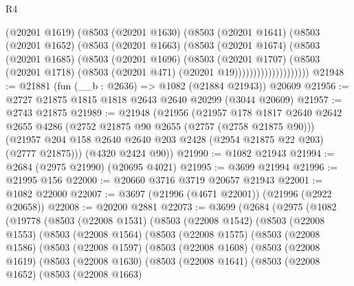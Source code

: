 \begin{lexlean}{R4}
\begin{coremodule}
                      (@20201 @1619)
                      (@8503
                        (@20201 @1630)
                        (@8503
                          (@20201 @1641)
                          (@8503
                            (@20201 @1652)
                            (@8503
                              (@20201 @1663)
                              (@8503
                                (@20201 @1674)
                                (@8503
                                  (@20201 @1685)
                                  (@8503
                                    (@20201 @1696)
                                    (@8503
                                      (@20201 @1707)
                                      (@8503
                                        (@20201 @1718)
                                        (@8503 (@20201 @471) (@20201 @19))))))))))))))))))))
@21948 := @21881 (fun (__b : @2636) => @1082 (@21884 @21943)) @20609
@21956 := @2727 @21875 @1815 @1818 @2643 @2640 @20299 (@3044 @20609)
@21957 := @2743 @21875
@21989 := @21948
    (@21956
      (@21957
        @178
        @1817
        @2640
        @2642
        @2655
        @4286
        (@2752 @21875 @90 @2655 (@2757 (@2758 @21875 @90)))
        (@21957 @204 @158 @2640 @2640 @203 @2428 (@2954 @21875 @22 @203) (@2777 @21875)))
      (@4320 @2424 @90))
@21990 := @1082 @21943
@21994 := @2684 (@2975 @21990) (@20695 @4021)
@21995 := @3699 @21994
@21996 := @21995 @156
@22000 := @20660 @3716 @3719 @20657 @21943
@22001 := @1082 @22000
@22007 := @3697 (@21996 (@4671 @22001)) (@21996 (@2922 @20658))
@22008 := @20200 @2881
@22073 := @3699
    (@2684
      (@2975
        (@1082
          (@19778
            (@8503
              (@22008 @1531)
              (@8503
                (@22008 @1542)
                (@8503
                  (@22008 @1553)
                  (@8503
                    (@22008 @1564)
                    (@8503
                      (@22008 @1575)
                      (@8503
                        (@22008 @1586)
                        (@8503
                          (@22008 @1597)
                          (@8503
                            (@22008 @1608)
                            (@8503
                              (@22008 @1619)
                              (@8503
                                (@22008 @1630)
                                (@8503
                                  (@22008 @1641)
                                  (@8503
                                    (@22008 @1652)
                                    (@8503
                                      (@22008 @1663)

\end{coremodule}
\end{lexlean}

